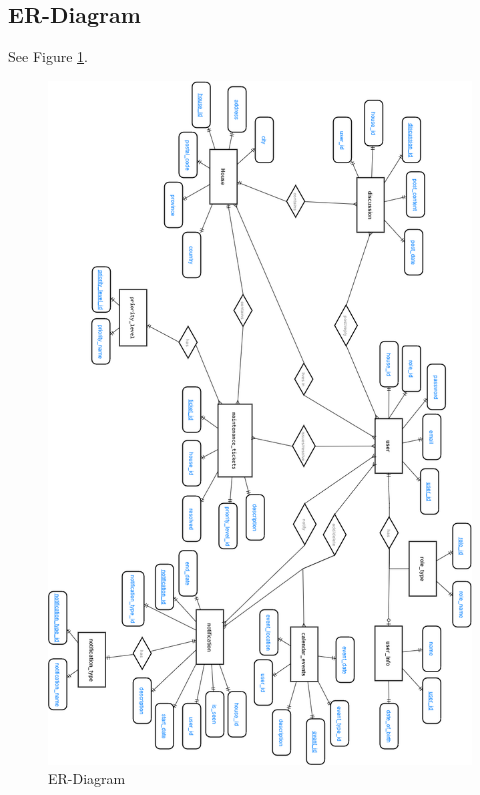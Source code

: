 \documentclass[12pt]{article}
\begin{document}
\subsection{ER-Diagram}
See Figure \ref{fig:er}.
\begin{figure}[b]
    \centering
  \includegraphics[scale=0.5, keepaspectratio]{images/ER_Diagram.png}
  \caption{ER-Diagram}
  \label{fig:er}
\end{figure}
\end{document}
